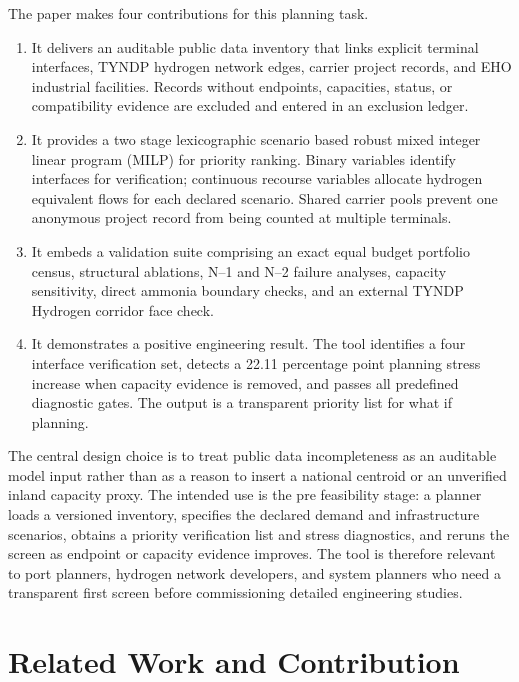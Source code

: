 \documentclass{ieeeaccess}
\begin{document}
The paper makes four contributions for this planning task.

\begin{enumerate}
    \item It delivers an auditable public data inventory that links explicit terminal interfaces, TYNDP hydrogen network edges, carrier project records, and EHO industrial facilities. Records without endpoints, capacities, status, or compatibility evidence are excluded and entered in an exclusion ledger.
    \item It provides a two stage lexicographic scenario based robust mixed integer linear program (MILP) for priority ranking. Binary variables identify interfaces for verification; continuous recourse variables allocate hydrogen equivalent flows for each declared scenario. Shared carrier pools prevent one anonymous project record from being counted at multiple terminals.
    \item It embeds a validation suite comprising an exact equal budget portfolio census, structural ablations, N--1 and N--2 failure analyses, capacity sensitivity, direct ammonia boundary checks, and an external TYNDP Hydrogen corridor face check.
    \item It demonstrates a positive engineering result. The tool identifies a four interface verification set, detects a 22.11 percentage point planning stress increase when capacity evidence is removed, and passes all predefined diagnostic gates. The output is a transparent priority list for what if planning.
\end{enumerate}

The central design choice is to treat public data incompleteness as an auditable model input rather than as a reason to insert a national centroid or an unverified inland capacity proxy. The intended use is the pre feasibility stage: a planner loads a versioned inventory, specifies the declared demand and infrastructure scenarios, obtains a priority verification list and stress diagnostics, and reruns the screen as endpoint or capacity evidence improves. The tool is therefore relevant to port planners, hydrogen network developers, and system planners who need a transparent first screen before commissioning detailed engineering studies.

\section{Related Work and Contribution}
\label{sec:related}
\end{document}
